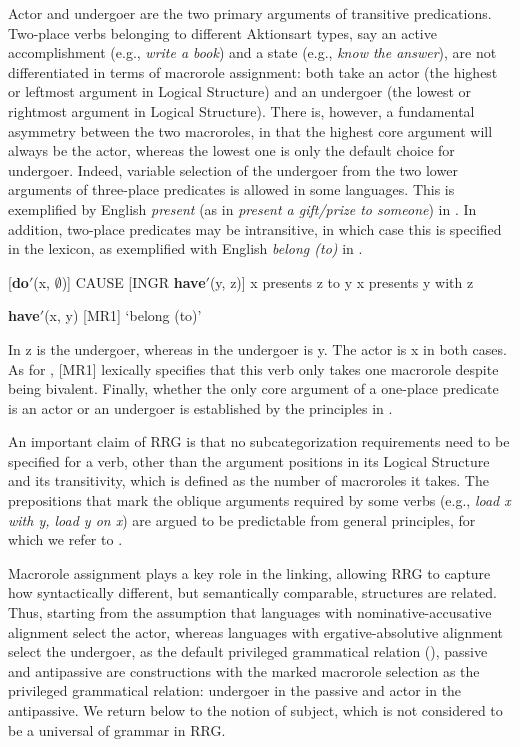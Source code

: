 \documentclass[output=paper,hidelinks]{langscibook}
\begin{document}
  Actor and undergoer are the two primary arguments of transitive predications. Two-place verbs belonging to different Aktionsart types, say an active accomplishment (e.g., \textit{write a book}) and a state (e.g., \textit{know the answer}), are not differentiated in terms of macrorole assignment: both take an actor (the highest or leftmost argument in Logical Structure) and an undergoer (the lowest or rightmost argument in Logical Structure). There is, however, a fundamental asymmetry between the two macroroles, in that the highest core argument will always be the actor, whereas the lowest one is only the default choice for undergoer. Indeed, variable selection of the undergoer from the two lower arguments of three-place predicates is allowed in some languages. This is exemplified by English \textit{present} (as in \emph{present a gift/prize to someone}) in . In addition, two-place predicates may be intransitive, in which case this is specified in the lexicon, as exemplified with English \textit{belong (to)} in .

\ea%
   \label{ex:RRG:11}
\ea\label{ex:RRG:11a} [\textbf{do$'$}(x, $\emptyset$)] CAUSE [INGR \textbf{have$'$}(y, z)]
\ex\label{ex:RRG:11b} x presents z to y
\ex\label{ex:RRG:11c} x presents y with z
\z\z

\ea%
\label{ex:RRG:12}
\textbf{have$'$}(x, y) [MR1] `belong (to)'
\z

\noindent In  z is the undergoer, whereas in  the undergoer is y. The actor is x in both cases. As for , [MR1] lexically specifies that this verb only takes one macrorole despite being bivalent. Finally, whether the only core argument of a one-place predicate is an actor or an undergoer is established by the principles in .

  An important claim of RRG is that no subcategorization requirements need to be specified for a verb, other than the argument positions in its Logical Structure and its transitivity, which is defined as the number of macroroles it takes. The prepositions that mark the oblique arguments required by some verbs (e.g., \textit{load x with y, load y on x}) are argued to be predictable from general principles, for which we refer to \citet[376-384]{VanValin1997}.

  Macrorole assignment plays a key role in the linking, allowing RRG to capture how syntactically different, but semantically comparable, structures are related. Thus, starting from the assumption that languages with nominative-accusative alignment select the actor, whereas languages with ergative-absolutive alignment select the undergoer, as the default privileged grammatical relation (), passive and antipassive are constructions with the marked macrorole selection as the privileged grammatical relation: undergoer in the passive and actor in the antipassive. We return below to the notion of subject, which is not considered to be a universal of grammar in RRG.
\end{document}
